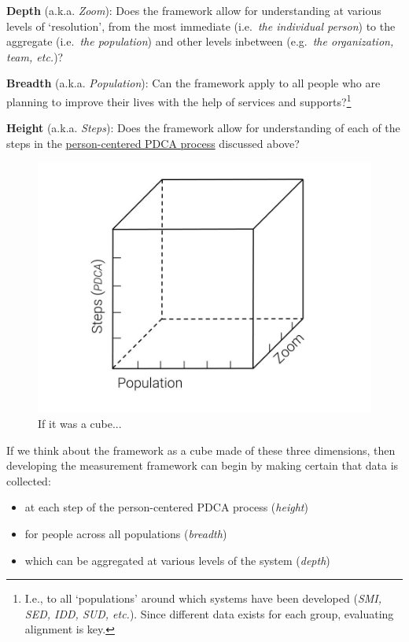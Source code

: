 \documentclass[
]{book}
\providecommand{\tightlist}{%
  \setlength{\itemsep}{0pt}\setlength{\parskip}{0pt}}
\begin{document}
\textbf{Depth} (a.k.a. \emph{Zoom}): Does the framework allow for understanding at various levels of `resolution', from the most immediate (i.e.~\emph{the individual person}) to the aggregate (i.e.~\emph{the population}) and other levels inbetween (e.g.~\emph{the organization, team, etc.})?

\textbf{Breadth} (a.k.a. \emph{Population}): Can the framework apply to all people who are planning to improve their lives with the help of services and supports?\footnote{I.e., to all `populations' around which systems have been developed (\emph{SMI, SED, IDD, SUD, etc.}). Since different data exists for each group, evaluating alignment is key.}

\textbf{Height} (a.k.a. \emph{Steps}): Does the framework allow for understanding of each of the steps in the \protect\hyperlink{pcpdca}{person-centered PDCA process} discussed above?

\begin{figure}
\includegraphics[width=24in]{_bookdown_files/img/QoL Framework Cube} \caption{If it was a cube...}\label{fig:unnamed-chunk-10}
\end{figure}

If we think about the framework as a cube made of these three dimensions, then developing the measurement framework can begin by making certain that data is collected:

\begin{itemize}
\tightlist
\item
  at each step of the person-centered PDCA process (\emph{height})
\item
  for people across all populations (\emph{breadth})
\item
  which can be aggregated at various levels of the system (\emph{depth})
\end{itemize}
\end{document}
